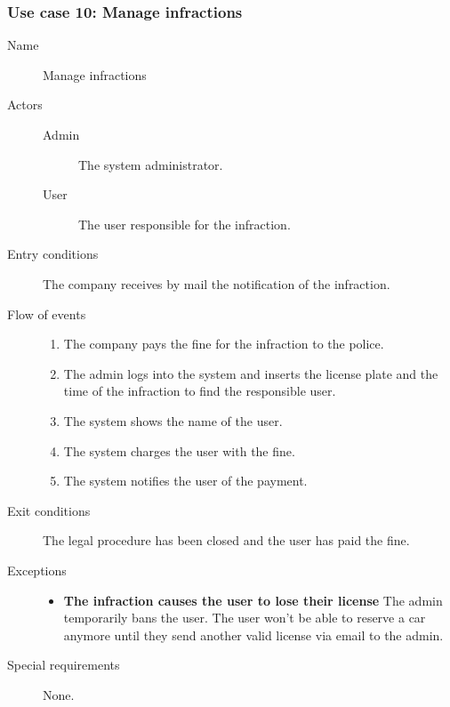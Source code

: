 	\subsubsection{Use case 10: Manage infractions}
		\begin{description}
			\item[Name] Manage infractions
			\item[Actors] \hfill
				\begin{description}
					\item[Admin] The system administrator.
					\item[User] The user responsible for the infraction.
				\end{description}
			\item[Entry conditions] The company receives by mail the notification of the infraction.
			\item[Flow of events] \hfill
				\begin{enumerate}
					\item The company pays the fine for the infraction to the police.
					\item The admin logs into the system and inserts the license plate and the time of the infraction to find the responsible user.
					\item The system shows the name of the user.
					\item The system charges the user with the fine.
					\item The system notifies the user of the payment.
				\end{enumerate}
			\item[Exit conditions] The legal procedure has been closed and the user has paid the fine.
			\item[Exceptions] \hfill
				\begin{itemize}
					\item \textbf{The infraction causes the user to lose their license} The admin temporarily bans the user. The user won't be able to reserve a car anymore until they send another valid license via email to the admin.
				\end{itemize}
			\item[Special requirements] None.
		\end{description}

